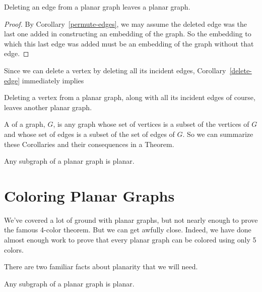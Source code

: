 \begin{editingnotes}
\begin{corollary}\label{delete-edge}
Deleting an edge from a planar graph leaves a planar graph.

\begin{proof}
  By Corollary~\ref{permute-edges}, we may assume the deleted edge was the
  last one added in constructing an embedding of the graph.  So the
  embedding to which this last edge was added must be an embedding of the
  graph without that edge.
\end{proof}

\end{corollary}

Since we can delete a vertex by deleting all its incident edges,
Corollary~\ref{delete-edge} immediately implies

\begin{corollary}%
Deleting a vertex from a planar graph, along with all its incident
edges of course, leaves another planar graph.
\end{corollary}

A  of a graph, $G$, is any graph whose set of vertices is a
subset of the vertices of $G$ and whose set of edges is a subset of the
set of edges of $G$.  So we can summarize these Corollaries %
and their consequences in a Theorem.

\begin{theorem}%
  Any subgraph of a planar graph is planar.
\end{theorem}
\end{editingnotes}


\section{Coloring Planar Graphs}

We've covered a lot of ground with planar graphs, but not nearly
enough to prove the famous 4-color theorem.  But we can get awfully
close.  Indeed, we have done almost enough work to prove that every
planar graph can be colored using only 5 colors.

There are two familiar facts about planarity that we will need.

\begin{lemma}\label{planar-subgraph}
  Any subgraph of a planar graph is planar.
\end{lemma}

